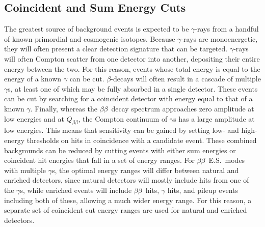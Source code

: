\documentclass[notitlepage,rmp,aps,10pt]{revtex4-1}
\newcommand{\bb}{${\beta \beta}$}
\newcommand{\bbes}{\bb~E.S.}
\newcommand{\Qbb}{$Q_{\beta\beta}$}
\begin{document}
\subsection{Coincident and Sum Energy Cuts} \label{sec:MSenergycuts}
The greatest source of background events is expected to be $\gamma$-rays from a handful of known primordial and cosmogenic isotopes.
Because $\gamma$-rays are monoenergetic, they will often present a clear detection signature that can be targeted.
$\gamma$-rays will often Compton scatter from one detector into another, depositing their entire energy between the two.
For this reason, events whose total energy is equal to the energy of a known $\gamma$ can be cut.
$\beta$-decays will often result in a cascade of multiple $\gamma$s, at least one of which may be fully absorbed in a single detector.
These events can be cut by searching for a coincident detector with energy equal to that of a known $\gamma$.
Finally, whereas the \bb\ decay spectrum approaches zero amplitude at low energies and at \Qbb, the Compton continuum of $\gamma$s has a large amplitude at low energies.
This means that sensitivity can be gained by setting low- and high-energy thresholds on hits in coincidence with a candidate event.
These combined backgrounds can be reduced by cutting events with either sum energies or coincident hit energies that fall in a set of energy ranges.
For \bbes\ modes with multiple $\gamma$s, the optimal energy ranges will differ between natural and enriched detectors, since natural detectors will mostly include hits from one of the $\gamma$s, while enriched events will include \bb\ hits, $\gamma$ hits, and pileup events including both of these, allowing a much wider energy range.
For this reason, a separate set of coincident cut energy ranges are used for natural and enriched detectors.
\end{document}
